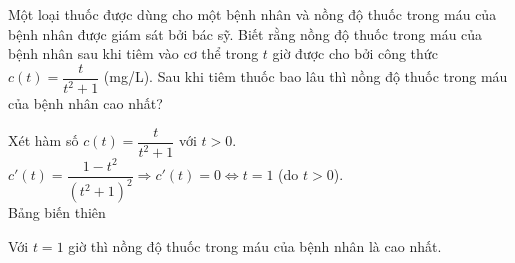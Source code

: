\begin{bt}%
Một loại thuốc được dùng cho một bệnh nhân và nồng độ thuốc trong máu của bệnh nhân được giám sát bởi bác sỹ. Biết rằng nồng độ thuốc trong máu của bệnh nhân sau khi tiêm vào cơ thể trong $t$ giờ được cho bởi công thức $c \left(t \right) = \dfrac{t}{t^2+1}$ (mg/L). Sau khi tiêm thuốc bao lâu thì nồng độ thuốc trong máu của bệnh nhân cao nhất? 
\loigiai
{
Xét hàm số $c \left(t \right) = \dfrac{t}{t^2+1}$ với $t >0$. \\
$c' \left(t\right) = \dfrac{1 - t^2}{\left(t^2 +1\right)^2} \Rightarrow c' \left(t\right) =0 \Leftrightarrow t =1$ (do $t>0$). \\
Bảng biến thiên 
\begin{center}
\end{center}
Với $t=1$ giờ thì nồng độ thuốc trong máu của bệnh nhân là cao nhất. 
}
\end{bt}

